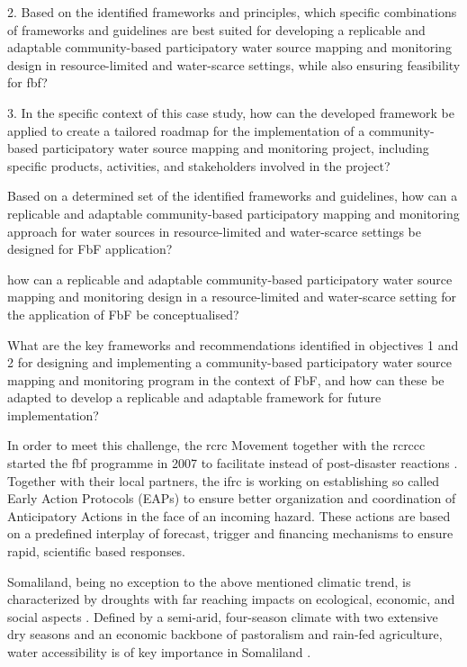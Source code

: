 2. Based on the identified frameworks and principles, which specific combinations of frameworks and guidelines are best suited for developing a replicable and adaptable community-based participatory water source mapping and monitoring design in resource-limited and water-scarce settings, while also ensuring feasibility for \acrlong{fbf}?

3. In the specific context of this case study, how can the developed framework be applied to create a tailored roadmap for the implementation of a community-based participatory water source mapping and monitoring project, including specific products, activities, and stakeholders involved in the project?




Based on a determined set of the identified frameworks and guidelines, how can a replicable and adaptable community-based participatory mapping and monitoring approach for water sources in resource-limited and water-scarce settings be designed for FbF application?

how can a replicable and adaptable community-based participatory water source mapping and monitoring design in a resource-limited and water-scarce setting for the application of FbF be conceptualised?


What are the key frameworks and recommendations identified in objectives 1 and 2 for designing and implementing a community-based participatory water source mapping and monitoring program in the context of FbF, and how can these be adapted to develop a replicable and adaptable framework for future implementation?



In order to meet this challenge, the \acrlong{rcrc} Movement together with the \acrlong*{rcrccc} started the \acrfull*{fbf} programme in 2007 to facilitate  instead of post-disaster reactions \autocite{ifrcForecastbasedFinancingNew2019}. Together with their local partners, the \acrfull*{ifrc} is working on establishing so called Early Action Protocols (EAPs) to ensure better organization and coordination of Anticipatory Actions in the face of an incoming hazard. These actions are based on a predefined interplay of forecast, trigger and financing mechanisms to ensure rapid, scientific based responses.\newline

Somaliland, being no exception to the above mentioned climatic trend, is characterized by droughts with far reaching impacts on ecological, economic, and social aspects \autocite{abdulkadirAssessmentDroughtRecurrence2017}. Defined by a semi-arid, four-season climate with two extensive dry seasons and an economic backbone of pastoralism and rain-fed agriculture, water accessibility is of key importance in Somaliland \autocite{abdulkadirAssessmentDroughtRecurrence2017,petrucciLandscapeLandformsNorthern2022,republicofsomalilandSomalilandCountryProfile2021}.

